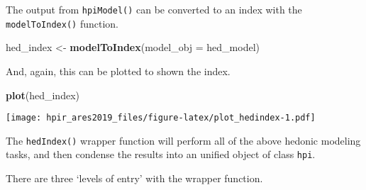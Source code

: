 \documentclass[]{article}
\newenvironment{Shaded}{\begin{snugshade}}{\end{snugshade}}
\newcommand{\DataTypeTok}[1]{\textcolor[rgb]{0.13,0.29,0.53}{#1}}
\newcommand{\KeywordTok}[1]{\textcolor[rgb]{0.13,0.29,0.53}{\textbf{#1}}}
\newcommand{\NormalTok}[1]{#1}
\newcommand{\StringTok}[1]{\textcolor[rgb]{0.31,0.60,0.02}{#1}}
\begin{document}
The output from \texttt{hpiModel()} can be converted to an index with
the \texttt{modelToIndex()} function.

\begin{Shaded}
\begin{Highlighting}[]
\NormalTok{  hed_index <-}\StringTok{ }\KeywordTok{modelToIndex}\NormalTok{(}\DataTypeTok{model_obj =}\NormalTok{ hed_model)}
\end{Highlighting}
\end{Shaded}

And, again, this can be plotted to shown the index.

\begin{Shaded}
\begin{Highlighting}[]
  \KeywordTok{plot}\NormalTok{(hed_index)}
\end{Highlighting}
\end{Shaded}

\texttt{[image: hpir\_ares2019\_files/figure-latex/plot\_hedindex-1.pdf]}

The \texttt{hedIndex()} wrapper function will perform all of the above
hedonic modeling tasks, and then condense the results into an unified
object of class \texttt{hpi}.

There are three `levels of entry' with the wrapper function.
\end{document}
